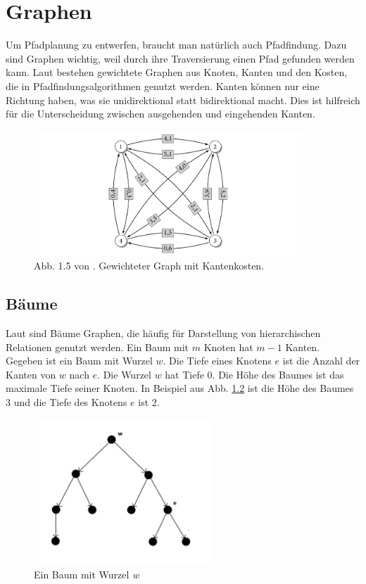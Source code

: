\chapter{Graphen}
Um Pfadplanung zu entwerfen, braucht man natürlich auch Pfadfindung. Dazu sind Graphen wichtig, weil durch ihre Traversierung einen Pfad gefunden werden kann. Laut \cite{Turau:15} bestehen gewichtete Graphen aus Knoten, Kanten und den Kosten, die in Pfadfindungsalgorithmen genutzt werden. Kanten können nur eine Richtung haben, was sie unidirektional statt bidirektional macht. Dies ist hilfreich für die Unterscheidung zwischen ausgehenden und eingehenden Kanten.

\begin{figure} %
	\centering
	\includegraphics[width=0.9\textwidth]{images/kk_graph_S6.png}
	\caption{Abb. 1.5 von \cite[~S. 6]{Turau:15}. Gewichteter Graph mit Kantenkosten.}
	\label{sec0a}
\end{figure}

\section{Bäume}
Laut \cite{Turau:15} sind Bäume Graphen, die häufig für Darstellung von hierarchischen Relationen genutzt werden. Ein Baum mit $m$ Knoten hat $m-1$ Kanten.\\
Gegeben ist ein Baum mit Wurzel $w$. Die Tiefe eines Knotens $e$ ist die Anzahl der Kanten von $w$ nach $e$. Die Wurzel $w$ hat Tiefe 0. Die Höhe des Baumes ist das maximale Tiefe seiner Knoten. In Beispiel aus Abb. \ref{sec0b} ist die Höhe des Baumes 3 und die Tiefe des Knotens $e$ ist 2.

\begin{figure} %
	\centering
	\includegraphics[width=0.6\textwidth]{images/Tree_Graph.png}
	\caption{Ein Baum mit Wurzel \textit{w}}
	\label{sec0b}
\end{figure}

